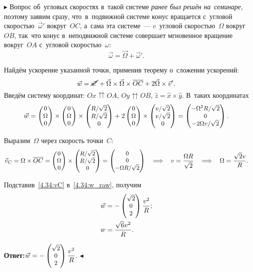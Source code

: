 \documentclass{weekly}
\begin{document}
$\blacktriangleright$ Вопрос об~угловых скоростях
в~такой системе \emph{ранее был решён на~семинаре,}
поэтому заявим сразу, что~в~подвижной системе
конус вращается с~угловой скоростью~$\vec\omega'$
вокруг~$OC$, а~сама эта системе~--- c~угловой скоростью~$\Omega$
вокруг~$OB$, так~что конус в~неподвижной системе
совершает мгновенное вращение вокруг~$OA$
с~угловой скоростью~$\omega$:
\begin{equation}
    \vec\omega = \vec\Omega + \vec\omega'.
\end{equation}

Найдём ускорение указанной точки, применив теорему о~сложении
ускорений:
\begin{equation}
    \vec w = \cancel{\vec w'} +
            \vec\Omega\times\vec\Omega\times\overline{OC}
            + 2\vec\Omega \times \vec v'.
\end{equation}
Введём систему координат: $Ox \upuparrows OA$, $Oy \upuparrows OB$,
$\hat z = \hat x \times \hat y$. В~таких координатах
\begin{equation}
    \vec w = \small\begin{pmatrix}0\\\Omega\\0\end{pmatrix} \times \small\begin{pmatrix}0\\\Omega\\0\end{pmatrix} \times
            \small\begin{pmatrix}R/\sqrt{2}\\R/\sqrt{2}\\0\end{pmatrix} +
            2 \small\begin{pmatrix}0\\\Omega\\0\end{pmatrix} \times
            \small\begin{pmatrix}v/\sqrt{2}\\v/\sqrt{2}\\0\end{pmatrix}
        = \small\begin{pmatrix}-\Omega^2 R/\sqrt{2}\\0\\-2\Omega v/\sqrt{2}\end{pmatrix}.
        \label{4.34:w_raw}
\end{equation}

Выразим~$\Omega$ через скорость точки~$C$:
\begin{equation}
    \vec v_C = \Omega \times \overline{OC}
        = \small\begin{pmatrix}0\\\Omega\\0\end{pmatrix} \times
            \small\begin{pmatrix}R/\sqrt{2}\\R/\sqrt{2}\\0\end{pmatrix}
        = \small\begin{pmatrix}0\\0\\-\Omega R/\sqrt{2}\end{pmatrix}
    \quad \Longrightarrow \quad
        v = \frac{\Omega R}{\sqrt{2}}
    \quad \Longrightarrow \quad
        \Omega = \frac{\sqrt{2}v}{R}. \label{4.34:vC}
\end{equation}

Подставив~\eqref{4.34:vC} в~\eqref{4.34:w_raw}, получим
\begin{align}
    \vec w &= -\small\begin{pmatrix}\sqrt{2}\\0\\2\end{pmatrix} \frac{v^2}{R}; \\
    w &= \frac{\sqrt{6} v^2}{R}.
\end{align}

\textbf{Ответ:}\quad $\vec w = -\small\begin{pmatrix}\sqrt{2}\\0\\2\end{pmatrix} \dfrac{v^2}{R}$.
\hfill $\blacktriangleleft$
\end{document}
